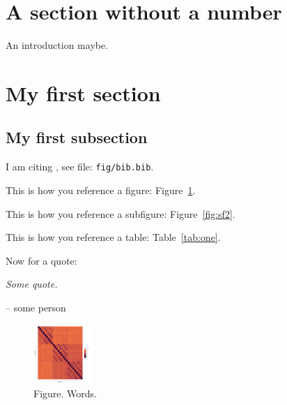 \documentclass{article}
\begin{document}



\tableofcontents

\clearpage


\section*{A section without a number}

An introduction maybe.

\section{My first section}

\subsection{My first subsection}


I am citing \cite{author1999}, see file: \texttt{fig/bib.bib}.

\bigskip

This is how you reference a figure: Figure~\ref{fig:one}.

\bigskip

This is how you reference a subfigure: Figure~\ref{fig:sf2}.

\bigskip

This is how you reference a table: Table~\ref{tab:one}.

\bigskip



Now for a quote:
\begin{displayquote}
\textsl{Some quote.}
\end{displayquote}
-- some person


\begin{figure}[h!]
 \centering
   \includegraphics[width=0.2\textwidth]{fig/corr.pdf}
 \caption{Figure. Words.} \label{fig:one}
\end{figure}



\end{document}
